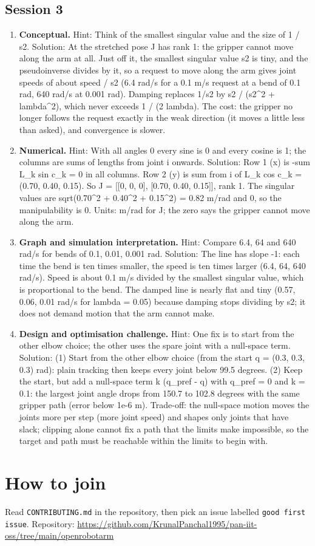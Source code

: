 \documentclass[11pt,a4paper]{article}
\begin{document}
\subsection*{Session 3}
\begin{enumerate}[nosep]
\item \textbf{Conceptual.} Hint: Think of the smallest singular value and the size of 1 / s2. Solution: At the stretched pose J has rank 1: the gripper cannot move along the arm at all. Just off it, the smallest singular value s2 is tiny, and the pseudoinverse divides by it, so a request to move along the arm gives joint speeds of about speed / s2 (6.4 rad/s for a 0.1 m/s request at a bend of 0.1 rad, 640 rad/s at 0.001 rad). Damping replaces 1/s2 by s2 / (s2\textasciicircum{}2 + lambda\textasciicircum{}2), which never exceeds 1 / (2 lambda). The cost: the gripper no longer follows the request exactly in the weak direction (it moves a little less than asked), and convergence is slower.
\item \textbf{Numerical.} Hint: With all angles 0 every sine is 0 and every cosine is 1; the columns are sums of lengths from joint i onwards. Solution: Row 1 (x) is -sum L\_k sin c\_k = 0 in all columns. Row 2 (y) is sum from i of L\_k cos c\_k = (0.70, 0.40, 0.15). So J = [[0, 0, 0], [0.70, 0.40, 0.15]], rank 1. The singular values are sqrt(0.70\textasciicircum{}2 + 0.40\textasciicircum{}2 + 0.15\textasciicircum{}2) = 0.82 m/rad and 0, so the manipulability is 0. Units: m/rad for J; the zero says the gripper cannot move along the arm.
\item \textbf{Graph and simulation interpretation.} Hint: Compare 6.4, 64 and 640 rad/s for bends of 0.1, 0.01, 0.001 rad. Solution: The line has slope -1: each time the bend is ten times smaller, the speed is ten times larger (6.4, 64, 640 rad/s). Speed is about 0.1 m/s divided by the smallest singular value, which is proportional to the bend. The damped line is nearly flat and tiny (0.57, 0.06, 0.01 rad/s for lambda = 0.05) because damping stops dividing by s2; it does not demand motion that the arm cannot make.
\item \textbf{Design and optimisation challenge.} Hint: One fix is to start from the other elbow choice; the other uses the spare joint with a null-space term. Solution: (1) Start from the other elbow choice (from the start q = (0.3, 0.3, 0.3) rad): plain tracking then keeps every joint below 99.5 degrees. (2) Keep the start, but add a null-space term k (q\_pref - q) with q\_pref = 0 and k = 0.1: the largest joint angle drops from 150.7 to 102.8 degrees with the same gripper path (error below 1e-6 m). Trade-off: the null-space motion moves the joints more per step (more joint speed) and shapes only joints that have slack; clipping alone cannot fix a path that the limits make impossible, so the target and path must be reachable within the limits to begin with.
\end{enumerate}

\section{How to join}
Read \texttt{CONTRIBUTING.md} in the repository, then pick an issue labelled \texttt{good first issue}. Repository: \url{https://github.com/KrunalPanchal1995/pan-iit-oss/tree/main/openrobotarm}
\end{document}
